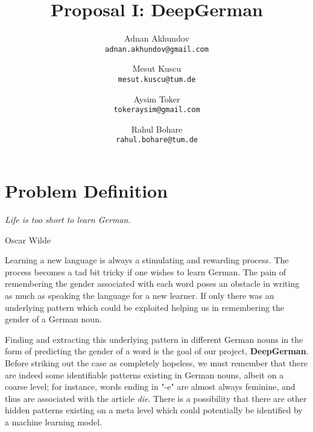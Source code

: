 \documentclass[10pt,twocolumn,letterpaper]{article}
\begin{document}
\title{Proposal I: DeepGerman}

\author{Adnan Akhundov\\
{\tt\small adnan.akhundov@gmail.com}
\and
Mesut Kuscu\\
{\tt\small mesut.kuscu@tum.de}
\and
Aysim Toker\\
{\tt\small tokeraysim@gmail.com}
\and
Rahul Bohare\\
{\tt\small rahul.bohare@tum.de}
}

\maketitle

\section{Problem Definition}
\epigraph{\textit{Life is too short to learn German}.}{Oscar Wilde}
Learning a new language is always a stimulating and rewarding process. The process becomes a tad bit tricky if one wishes to learn German. The pain of remembering the gender associated with each word poses an obstacle in writing as much as speaking the language for a new learner.
If only there was an underlying pattern which could be exploited helping us in remembering the gender of a German noun.\par
Finding and extracting this underlying pattern in different German nouns in the form of predicting the gender of a word is the goal of our project, \textbf{DeepGerman}. Before striking out the case as completely hopeless, we must remember that there are indeed some identifiable patterns existing in German nouns, albeit on a coarse level; for instance, words ending in {"}-e{"} are almost always feminine, and thus are associated with the article \textit{die}.
There is a possibility that there are other hidden patterns existing on a meta level which could potentially be identified by a machine learning model.
\end{document}
